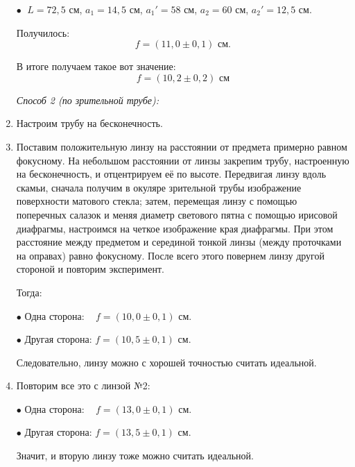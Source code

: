 \documentclass[a4paper,12pt]{article} %
\begin{document}
\begin{enumerate}
		$\bullet \;$ $L = 72,5$ см, $a_1 = 14,5$ см, $a_1' = 58$ см, $a_2 = 60$ см, $a_2' = 12,5$ см.
		
		Получилось:
		\begin{equation*}
			f = (11,0 \pm 0,1) \text{ см}.
		\end{equation*}
	
		В итоге получаем такое вот значение:
		\begin{equation*}
			\boxed{f = (10,2 \pm 0,2) \text{ см}}
		\end{equation*}
	
		\newpage
		\textit{Способ 2 (по зрительной трубе):}
		\item Настроим трубу на бесконечность.
		
		\item Поставим положительную линзу на расстоянии от предмета примерно равном фокусному. На небольшом расстоянии от линзы закрепим трубу, настроенную на бесконечность, и отцентрируем её по высоте. Передвигая линзу вдоль скамьи, сначала получим в окуляре зрительной трубы изображение поверхности матового стекла; затем, перемещая линзу с помощью поперечных салазок и меняя диаметр светового пятна с помощью ирисовой диафрагмы, настроимся на четкое изображение края диафрагмы. При этом расстояние между предметом и серединой тонкой линзы (между проточками на оправах) равно фокусному. После всего этого повернем линзу другой стороной и повторим эксперимент.
		
		\vspace{5mm}
		Тогда:
		
		$\bullet$ Одна сторона: $\;\;\; f = (10,0 \pm 0,1)$ см.
		
		$\bullet$ Другая сторона: $f = (10,5 \pm 0,1)$ см.
		
		Следовательно, линзу можно с хорошей точностью считать идеальной.
		
		\item Повторим все это с линзой №2:
		
		$\bullet$ Одна сторона: $\;\;\; f = (13,0 \pm 0,1)$ см.
		
		$\bullet$ Другая сторона: $f = (13,5 \pm 0,1)$ см.
		
		Значит, и вторую линзу тоже можно считать идеальной.
	
	\end{enumerate}
\end{document}
